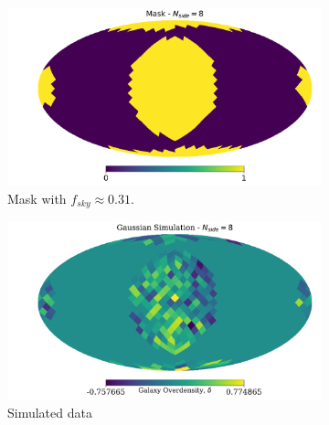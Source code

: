 \begin{figure}
\begin{subfigure}[b]{.5\textwidth}
 \includegraphics[scale=0.33]{BPL-FIGS/Blob_fsky_01_mask.pdf}
  \caption{Mask with $f_{sky} \approx 0.31$.}
  \label{fig:BPL:blobMask}
\end{subfigure}
\begin{subfigure}[b]{.5\textwidth}
 \includegraphics[scale=0.34]{BPL-FIGS/Blob_fsky_01_map.pdf}
  \caption{Simulated data}
  \label{fig:BPL:blobMap}
\end{subfigure}\\
\begin{subfigure}[b]{\textwidth}

\end{subfigure}
\end{figure}
